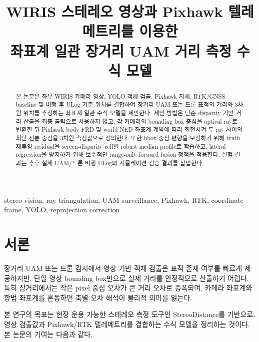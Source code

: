 \documentclass[10pt,conference]{IEEEtran}
\title{WIRIS 스테레오 영상과 Pixhawk 텔레메트리를 이용한\\
좌표계 일관 장거리 UAM 거리 측정 수식 모델}
\author{
\IEEEauthorblockN{저자명 TBD}
\IEEEauthorblockA{소속 TBD\\
Email: TBD}
}
\begin{document}
\maketitle

\begin{center}
\end{center}

\begin{abstract}
본 논문은 좌우 WIRIS 카메라 영상, YOLO 객체 검출, Pixhawk 자세, RTK/GNSS baseline 및 비행 후 ULog 기준 위치를 결합하여 장거리 UAM 또는 드론 표적의 거리와 3차원 위치를 추정하는 좌표계 일관 수식 모델을 제안한다.
제안 방법은 단순 disparity 기반 거리 산출을 최종 출력으로 사용하지 않고, 각 카메라의 bounding box 중심을 optical ray로 변환한 뒤 Pixhawk body FRD 및 world NED 좌표계 계약에 따라 회전시켜 두 ray 사이의 최단 선분 중점을 3차원 측정값으로 정의한다.
또한 bbox 중심 편향을 보정하기 위해 truth 재투영 residual을 screen-disparity cell별 robust median profile로 학습하고, lateral regression을 방지하기 위해 보수적인 range-only forward fusion 정책을 적용한다.
실험 결과는 추후 실제 UAM/드론 비행 ULog와 시뮬레이션 검증 결과를 삽입한다.
\end{abstract}

\begin{IEEEkeywords}
stereo vision, ray triangulation, UAM surveillance, Pixhawk, RTK, coordinate frame, YOLO, reprojection correction
\end{IEEEkeywords}

\section{서론}

장거리 UAM 또는 드론 감시에서 영상 기반 객체 검출은 표적 존재 여부를 빠르게 제공하지만, 단일 영상 bounding box만으로 실제 거리를 안정적으로 산출하기 어렵다.
특히 장거리에서는 작은 pixel 중심 오차가 큰 거리 오차로 증폭되며, 카메라 좌표계와 항법 좌표계를 혼동하면 축별 오차 해석이 물리적 의미를 잃는다.

본 연구의 목표는 현장 운용 가능한 스테레오 측정 도구인 StereoDistance를 기반으로, 영상 검출값과 Pixhawk/RTK 텔레메트리를 결합하는 수식 모델을 정리하는 것이다.
본 논문의 기여는 다음과 같다.
\end{document}
